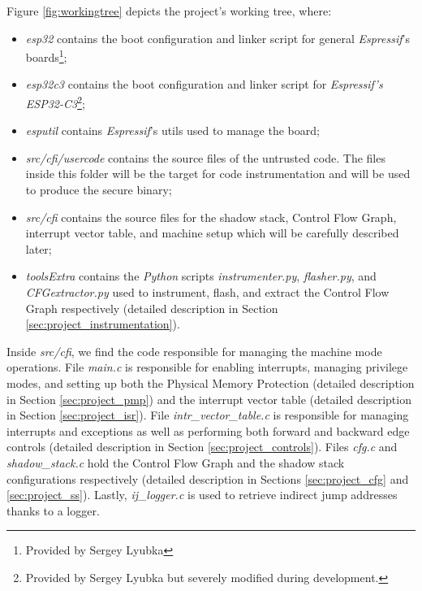 Figure \ref{fig:workingtree} depicts the project's working tree, where:

\begin{itemize}
  \item \textit{esp32} contains the boot configuration and linker script for
    general \textit{Espressif}'s boards\footnote{Provided by Sergey Lyubka};

  \item \textit{esp32c3} contains the boot configuration and linker script for
    \textit{Espressif's ESP32-C3}\footnote{Provided by Sergey Lyubka but
    severely modified during development.};

  \item \textit{esputil} contains \textit{Espressif}'s utils used to manage the board;

  \item \textit{src/cfi/usercode} contains the source files of the untrusted
    code. The files inside this folder will be the target for code instrumentation
    and will be used to produce the secure binary;

  \item \textit{src/cfi} contains the source files for the shadow stack, Control
    Flow Graph, interrupt vector table, and machine setup which will be carefully
    described later;

  \item \textit{toolsExtra} contains the \textit{Python} scripts \textit{instrumenter.py},
    \textit{flasher.py}, and \textit{CFGextractor.py} used to instrument, flash,
    and extract the Control Flow Graph respectively (detailed description in Section
    \ref{sec:project_instrumentation}).
\end{itemize}

Inside \textit{src/cfi}, we find the code responsible for managing the machine mode
operations. File \textit{main.c} is responsible for enabling interrupts,
managing privilege modes, and setting up both the Physical Memory Protection (detailed
description in Section \ref{sec:project_pmp}) and the interrupt vector table (detailed
description in Section \ref{sec:project_isr}). File \textit{intr\_vector\_table.c}
is responsible for managing interrupts and exceptions as well as performing both
forward and backward edge controls (detailed description in Section
\ref{sec:project_controls}). Files \textit{cfg.c} and \textit{shadow\_stack.c}
hold the Control Flow Graph and the shadow stack configurations respectively (detailed
description in Sections \ref{sec:project_cfg} and \ref{sec:project_ss}). Lastly,
\textit{ij\_logger.c} is used to retrieve indirect jump addresses thanks to a logger.

